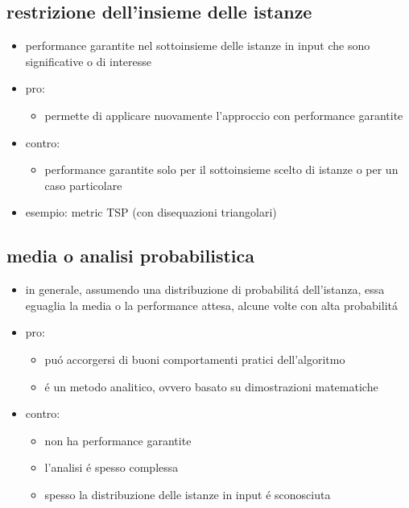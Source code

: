 \subsection*{restrizione dell'insieme delle istanze}
\begin{flushleft}
	\begin{itemize}
		\item performance garantite nel sottoinsieme delle istanze in input che sono significative o di interesse
		\item pro:
		\begin{itemize}
			\item permette di applicare nuovamente l'approccio con performance garantite
		\end{itemize}
		\item contro:
		\begin{itemize}
			\item performance garantite solo per il sottoinsieme scelto di istanze o per un caso particolare
		\end{itemize}
		\item esempio: metric TSP (con disequazioni triangolari)
	\end{itemize}
\end{flushleft}


\subsection*{media o analisi probabilistica}
\begin{flushleft}
	\begin{itemize}
		\item in generale, assumendo una distribuzione di probabilit\'a dell'istanza, essa eguaglia la media o la performance attesa, alcune volte con alta probabilit\'a
		\item pro:
		\begin{itemize}
			\item pu\'o accorgersi di buoni comportamenti pratici dell'algoritmo
			\item \'e un metodo analitico, ovvero basato su dimostrazioni matematiche
		\end{itemize}
		\item contro:
		\begin{itemize}
			\item non ha performance garantite
			\item l'analisi \'e spesso complessa
			\item spesso la distribuzione delle istanze in input \'e sconosciuta
		\end{itemize}
	\end{itemize}
\end{flushleft}

